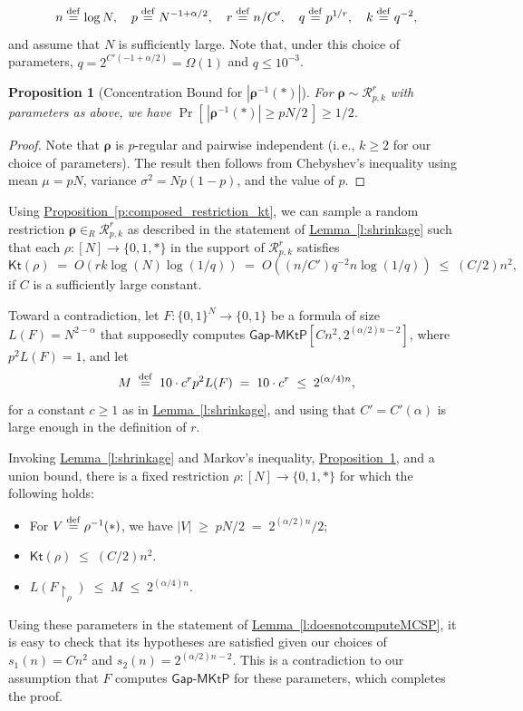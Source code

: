 \documentclass[11pt]{article}
\numberwithin{equation}{section}
\newtheorem{proposition}[theorem]{Proposition}
\theoremstyle{definition}
\theoremstyle{plain}
\newcommand{\ie}{i.\,e.}
\newcommand{\expref}[2]{\hyperref[#2]{#1~\ref{#2}}}
\newcommand{\eqdef}{\stackrel{\rm def}{=}}
\newcommand{\gapmktp}{\mathsf{Gap}$-$\mathsf{MKtP}}
\newcommand{\Kt}{\mathsf{Kt}}
\begin{document}
$$
n \eqdef \log N, \quad p \eqdef N^{-1 + \alpha/2}, \quad r \eqdef n/C', \quad q \eqdef p^{1/r}, \quad k \eqdef q^{-2},
$$
and assume that $N$ is sufficiently large. 
Note that, under this choice of parameters, $q = 2^{C'(-1 + \alpha/2)} = \Omega(1)$ and $q \leq 10^{-3}$.

\begin{proposition}[Concentration Bound for $|\bm{\rho}^{-1}(*)|$]\label{p:stars_concentration}
For $\bm{\rho} \sim \mathcal{R}^r_{p,k}$ with parameters as above, we have $\Pr[\,|\bm{\rho}^{-1}(*)| \geq pN/2\,] \geq 1/2$.
\end{proposition}

\begin{proof}
Note that $\bm{\rho}$ is $p$-regular and pairwise independent (\ie, $k \geq 2$ for our choice of parameters). The result then follows from Chebyshev's inequality using mean $\mu = pN$, variance $\sigma^2 = Np(1-p)$, and the value of $p$.
\end{proof}

Using \expref{Proposition}{p:composed_restriction_kt}, we can sample a random restriction $\bm{\rho} \in_R \mathcal{R}^r_{p,k}$ as described in the statement of \expref{Lemma}{l:shrinkage} such that each $\rho \colon [N] \to \{0,1,*\}$ in the support of $\mathcal{R}^r_{p,k}$ satisfies 
$$\Kt(\rho) \;=\; O(r k \log (N) \log (1/q)) \;=\; O((n/C') q^{-2} n \log (1/q)) \;\leq\; (C/2)n^2,$$
if $C$ is a sufficiently large constant.


Toward a contradiction, let $F \colon \{0,1\}^N \to \{0,1\}$ be a formula of size $L(F)=N^{2 - \alpha}$ that supposedly computes $\gapmktp[Cn^2, 2^{(\alpha/2) n - 2}]$, where $p^2 L(F) = 1$, and let 
$$M \;\eqdef\; 10 \cdot c^r p^2 L(F) \;=\;  10 \cdot c^r  \;\leq\; 2^{(\alpha/4)n},
$$
for a constant $c \geq 1$ as in \expref{Lemma}{l:shrinkage}, and using that $C' = C'(\alpha)$ is large enough in the definition of $r$.

Invoking \expref{Lemma}{l:shrinkage} and Markov's inequality, \expref{Proposition}{p:stars_concentration}, and a union bound, there is a fixed restriction $\rho \colon [N] \to \{0,1,*\}$ for which the following holds:
\begin{itemize}
\item For $V \eqdef \rho^{-1}(*)$, we have $|V| \;\geq\; pN/2 \;=\;2^{(\alpha/2)n}/2$;
\item $\Kt(\rho) \;\leq\; (C/2)n^2$.
\item $L(F\!\upharpoonright_\rho) \;\leq\; M \;\leq\;2^{(\alpha/4)n}$.
\end{itemize} 
Using these parameters in the statement of \expref{Lemma}{l:doesnotcomputeMCSP}, it is easy to check that its hypotheses are satisfied given our choices of $s_1(n) = Cn^2$ and $s_2(n) = 2^{(\alpha/2)n - 2}$. This is a contradiction to our assumption that $F$ computes $\gapmktp$ for these parameters, which completes the proof.
\end{document}
